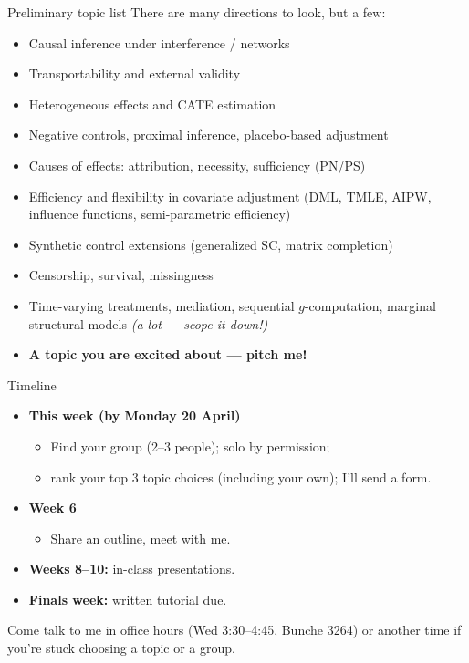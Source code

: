 \documentclass[xcolor=dvipsnames]{beamer}
\begin{document}

\begin{frame}{Preliminary topic list}
There are many directions to look, but a few:
\small
\begin{itemize}
    \item<1-> Causal inference under interference / networks
    \item<2-> Transportability and external validity
    \item<3-> Heterogeneous effects and CATE estimation
    \item<4-> Negative controls, proximal inference, placebo-based adjustment    
    \item<5-> Causes of effects: attribution, necessity, sufficiency (PN/PS)      
    \item<6-> Efficiency and flexibility in covariate adjustment (DML, TMLE, AIPW, influence functions, semi-parametric efficiency)
    \item<7-> Synthetic control extensions (generalized SC, matrix completion)
    \item<8-> Censorship, survival, missingness
    \item<9-> Time-varying treatments, mediation, sequential $g$-computation, marginal structural models \emph{(a lot --- scope it down!)}
    \item<10-> \textbf{A topic you are excited about --- pitch me!}
\end{itemize}
\end{frame}


\begin{frame}{Timeline}
\begin{itemize}
    \item<1-> \textbf{This week (by Monday 20 April)}
    \begin{itemize}
        \item Find your group (2--3 people); solo by permission;
        \item rank your top 3 topic choices (including your own); I'll send a form. 
	\end{itemize}
	\medskip
    \item<2-> \textbf{Week 6}
    \begin{itemize}
        \item Share an outline, meet with me. 
    \end{itemize}
\medskip
    \item<3-> \textbf{Weeks 8--10:} in-class presentations.
    \medskip
    \item<4-> \textbf{Finals week:} written tutorial due.
    \end{itemize}
    \medskip
     Come talk to me in office hours (Wed 3:30--4:45, Bunche 3264) or another time if you're stuck choosing a topic or a group.

\end{frame}
\end{document}
